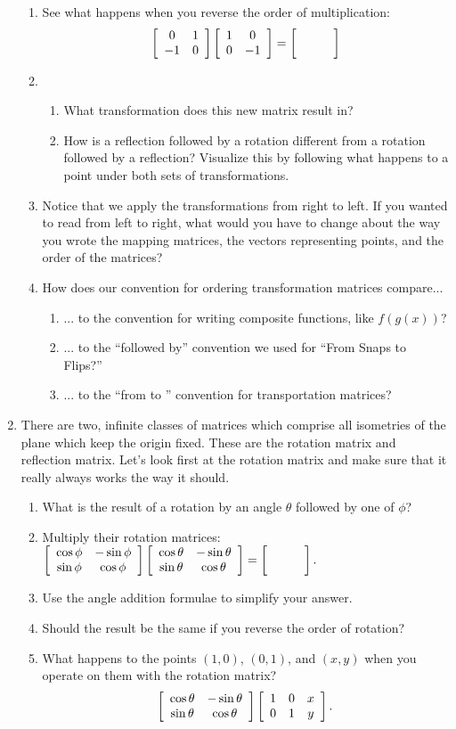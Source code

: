 \documentclass[../gatm.tex]{subfiles}
\begin{document}
\begin{enumerate}
\begin{enumerate}
\item See what happens when you reverse the order of multiplication: \label{prob:cm_fill_in_blank_end}
$$\twomat{0}{1}{-1}{0}\twomat{1}{0}{0}{-1}=\blanktwomat$$
\item \begin{enumerate}
\item What transformation does this new matrix result in?
\item How is a reflection followed by a rotation different from a rotation followed by a reflection? Visualize this by following what happens to a point under both sets of transformations.
\end{enumerate}
\item Notice that we apply the transformations from right to left. If you wanted to read from left to right, what would you have to change about the way you wrote the mapping matrices, the vectors representing points, and the order of the matrices?
\item How does our convention for ordering transformation matrices compare...
\begin{enumerate}
\item ... to the convention for writing composite functions, like $f(g(x))$?
\item ... to the ``followed by'' convention we used for ``From Snaps to Flips?''
\item ... to the ``from \underline{\phantom{egg}} to \underline{\phantom{egg}}'' convention for transportation matrices?
\end{enumerate}
\end{enumerate}
\item There are two, infinite classes of matrices which comprise all isometries of the plane which keep the origin fixed. These are the rotation matrix and reflection matrix. Let's look first at the rotation matrix and make sure that it really always works the way it should.
\begin{enumerate}
\item What is the result of a rotation by an angle $\theta$ followed by one of $\phi$?
\item Multiply their rotation matrices: $\twomat{\cos \phi}{-\sin \phi}{\sin\phi}{\cos\phi} \twomat{\cos \theta}{-\sin \theta}{\sin\theta}{\cos\theta}=\blanktwomat.$
\item Use the angle addition formulae to simplify your answer.
\item Should the result be the same if you reverse the order of rotation?
\item What happens to the points $(1,0)$, $(0,1)$, and $(x,y)$ when you operate on them with the rotation matrix? $$\left[\begin{array}{cc} \cos \theta & -\sin \theta \\ \sin\theta & \cos\theta \end{array}\right]\left[\begin{array}{ccc} 1 & 0 & x \\ 0 & 1 & y \end{array}\right].$$

\end{enumerate}
\end{enumerate}
\end{document}
